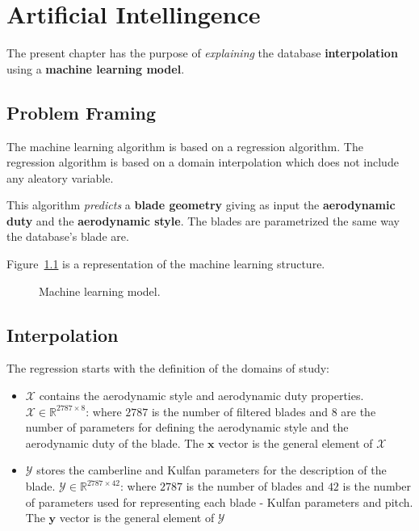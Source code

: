 \chapter{Artificial Intellingence}

\label{chapter:AI}

The present chapter has the purpose of \textit{explaining} the database \textbf{interpolation} using a \textbf{machine learning model}. 

\section{Problem Framing}

The machine learning algorithm is based on a regression algorithm. 
The regression algorithm is based on a domain interpolation which does not include any aleatory variable.

This algorithm \textit{predicts} a \textbf{blade geometry} giving as input the \textbf{aerodynamic duty} and the \textbf{aerodynamic style}. 
The blades are parametrized the same way the database's blade are.

Figure~\ref{fig:MLstructure} is a representation of the machine learning structure.

\begin{figure}[!h]
    
    \caption{Machine learning model.}
    \label{fig:MLstructure}
\end{figure}

\section{Interpolation}

The regression starts with the definition of the domains of study:

\begin{itemize}
    \item $\mathcal{X}$ contains the aerodynamic style and aerodynamic duty properties. 
    $\mathcal{X} \in \mathbb{R}^{2787 \times 8}$: where $2787$ is the number of filtered blades and $8$ are the number of parameters for defining the aerodynamic style and the aerodynamic duty of the blade.
    The $\boldsymbol{x}$ vector is the general element of $\mathcal{X}$
    \item $\mathcal{Y}$ stores the camberline and Kulfan parameters for the description of the blade. 
    $\mathcal{Y} \in \mathbb{R}^{2787 \times 42}$: where $2787$ is the number of blades and $42$ is the number of parameters used for representing each blade - Kulfan parameters and pitch.
    The $\boldsymbol{y}$ vector is the general element of $\mathcal{Y}$
\end{itemize}

